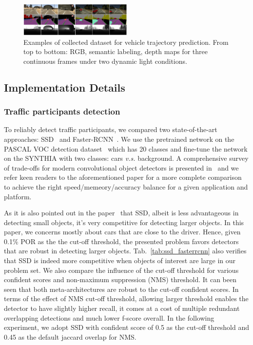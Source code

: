 \documentclass[10pt,twocolumn,letterpaper]{article}
\begin{document}
\begin{figure}[t]
        \centering
        \includegraphics[width=0.5\textwidth]{figures/dataset.pdf}
        \caption{Examples of collected dataset for vehicle trajectory prediction. From top to bottom: RGB, semantic labeling, depth maps for three continuous frames under two dynamic light conditions.}
        \label{fig:dataset}
\end{figure}

\subsection{Implementation Details}\label{sec:Implementations}


\subsubsection{Traffic participants detection}

To reliably detect traffic participants, we compared two state-of-the-art approaches: SSD~\cite{liu2016ssd} and Faster-RCNN~\cite{ren2015faster_nips}.
We use the pretrained network on the PASCAL VOC detection dataset~\cite{everingham2015pascal} which has 20 classes and fine-tune the network on the SYNTHIA with two classes: cars \emph{v.s.} background.
A comprehensive survey of trade-offs for modern convolutional object detectors is presented in~\cite{huang2017speed} and we refer keen readers to the aforementioned paper for a more complete comparison to achieve the right speed/memeory/accuracy balance for a given application and platform.

As it is also pointed out in the paper~\cite{huang2017speed} that SSD, albeit is less advantageous in detecting small objects, it's very competitive for detecting larger objects. In this paper, we concerns mostly about cars that are close to the driver. Hence, given 0.1\% POR as the the cut-off threshold, the presented problem favors detectors that are robust in detecting larger objects.
Tab.~\ref{tab:ssd_fasterrcnn} also verifies that SSD is indeed more competitive when objects of interest are large in our problem set.
We also compare the influence of the cut-off threshold for various confident scores and non-maximum suppression (NMS) threshold. It can been seen that both meta-architectures are robust to the cut-off confident scores.
In terms of the effect of NMS cut-off threshold, allowing larger threshold enables the detector to have slightly higher recall, it comes at a cost of multiple redundant overlapping detections and much lower f-score overall. In the following experiment, we adopt SSD with confident score of 0.5 as the cut-off threshold and 0.45 as the default jaccard overlap for NMS.
\end{document}

